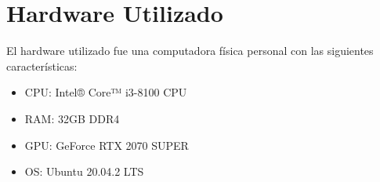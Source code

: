 \section{Hardware Utilizado}

El hardware utilizado fue una computadora física personal con las siguientes características:

\begin{itemize}
    \item CPU: Intel® Core™ i3-8100 CPU
    \item RAM: 32GB DDR4
    \item GPU: GeForce RTX 2070 SUPER
    \item OS: Ubuntu 20.04.2 LTS
\end{itemize}
